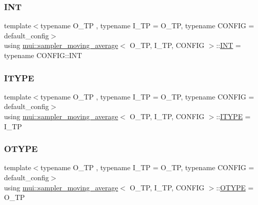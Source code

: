 \subsubsection{\texorpdfstring{I\+NT}{INT}}
{\footnotesize\ttfamily template$<$typename O\+\_\+\+TP , typename I\+\_\+\+TP  = O\+\_\+\+TP, typename C\+O\+N\+F\+IG  = default\+\_\+config$>$ \\
using \hyperlink{classmui_1_1sampler__moving__average}{mui\+::sampler\+\_\+moving\+\_\+average}$<$ O\+\_\+\+TP, I\+\_\+\+TP, C\+O\+N\+F\+IG $>$\+::\hyperlink{classmui_1_1sampler__moving__average_a9c2d6ff0743c06447c3224c32870d872}{I\+NT} =  typename C\+O\+N\+F\+I\+G\+::\+I\+NT}

\mbox{\label{classmui_1_1sampler__moving__average_a93946e297f6a01f4aad6297d4dc55662}} 
\subsubsection{\texorpdfstring{I\+T\+Y\+PE}{ITYPE}}
{\footnotesize\ttfamily template$<$typename O\+\_\+\+TP , typename I\+\_\+\+TP  = O\+\_\+\+TP, typename C\+O\+N\+F\+IG  = default\+\_\+config$>$ \\
using \hyperlink{classmui_1_1sampler__moving__average}{mui\+::sampler\+\_\+moving\+\_\+average}$<$ O\+\_\+\+TP, I\+\_\+\+TP, C\+O\+N\+F\+IG $>$\+::\hyperlink{classmui_1_1sampler__moving__average_a93946e297f6a01f4aad6297d4dc55662}{I\+T\+Y\+PE} =  I\+\_\+\+TP}

\mbox{\label{classmui_1_1sampler__moving__average_af5b1ae5cd60a907dbbd1f3fe978263dd}} 
\subsubsection{\texorpdfstring{O\+T\+Y\+PE}{OTYPE}}
{\footnotesize\ttfamily template$<$typename O\+\_\+\+TP , typename I\+\_\+\+TP  = O\+\_\+\+TP, typename C\+O\+N\+F\+IG  = default\+\_\+config$>$ \\
using \hyperlink{classmui_1_1sampler__moving__average}{mui\+::sampler\+\_\+moving\+\_\+average}$<$ O\+\_\+\+TP, I\+\_\+\+TP, C\+O\+N\+F\+IG $>$\+::\hyperlink{classmui_1_1sampler__moving__average_af5b1ae5cd60a907dbbd1f3fe978263dd}{O\+T\+Y\+PE} =  O\+\_\+\+TP}

